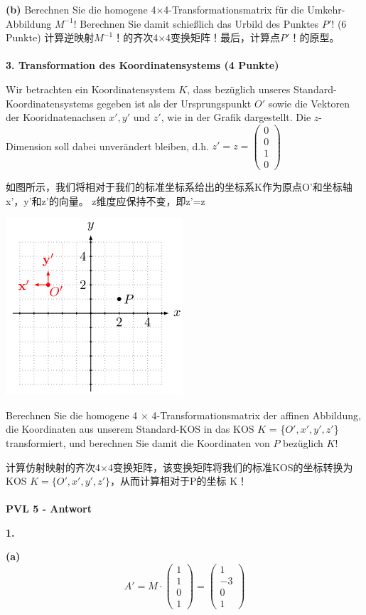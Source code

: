\documentclass[fleqn]{article}
\begin{document}
\indent\textbf{(b)} Berechnen Sie die homogene 4$\times$4-Transformationsmatrix für die Umkehr-Abbildung $M^{−1}$! Berechnen Sie damit schießlich das Urbild des Punktes $P'$! (6 Punkte)
计算逆映射$M^{-1}$！的齐次4$\times$4变换矩阵！最后，计算点$P'$！的原型。
\\
\\
\noindent\textbf{3. Transformation des Koordinatensystems (4 Punkte)}

Wir betrachten ein Koordinatensystem $K$,
 dass bezüglich unseres Standard-Koordinatensystems gegeben ist als der Ursprungspunkt $O'$
 sowie die Vektoren der Kooridnatenachsen $x', y'$ und $z'$, 
 wie in der Grafik dargestellt. Die $z$-Dimension soll dabei unverändert bleiben, d.h. $z'=z=\begin{pmatrix}
     0\\0\\1\\0
 \end{pmatrix}$ 
 
 如图所示，我们将相对于我们的标准坐标系给出的坐标系K作为原点O'和坐标轴x'，y'和z'的向量。 z维度应保持不变，即z'=z

 \includegraphics[scale=0.6]{20.png}

 Berechnen Sie die homogene 4 $\times$ 4-Transformationsmatrix der affinen Abbildung,
  die Koordinaten aus unserem Standard-KOS in das KOS $K$ = \{$O',x',y',z'$\} transformiert, 
  und berechnen Sie damit die Koordinaten von $P$ bezüglich $K$!

  计算仿射映射的齐次4$\times$4变换矩阵，该变换矩阵将我们的标准KOS的坐标转换为KOS $K = \{O',x',y',z'\}$，从而计算相对于P的坐标 K！
\\
\\
\noindent\textbf{PVL 5 - Antwort}

\indent\textbf{1.}

\indent\indent\textbf{(a)}
$$A' = M\cdot\begin{pmatrix} 1 \\ 1 \\ 0 \\ 1 \end{pmatrix} =\begin{pmatrix} 1 \\ -3 \\ 0 \\ 1 \end{pmatrix} $$
\end{document}
